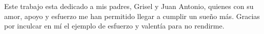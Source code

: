 \begin{dedication}
    Este trabajo esta dedicado a mis padres, Grisel y Juan Antonio, quienes con su amor, apoyo y esfuerzo me han permitido llegar a cumplir un sueño más. Gracias por inculcar en mí el ejemplo de esfuerzo y valentía para no rendirme.
\end{dedication}